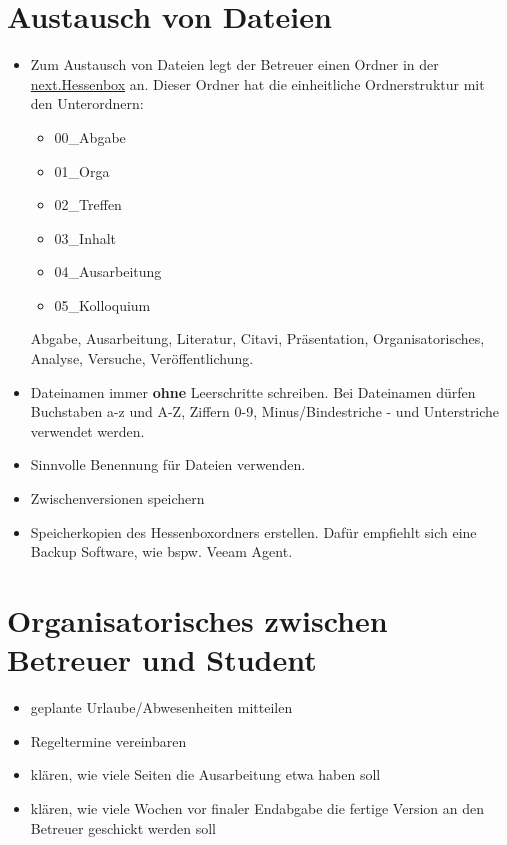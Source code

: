 \section{Austausch von Dateien}
\begin{itemize}

    \item Zum Austausch von Dateien legt der Betreuer einen Ordner in der \href{https://next.hessenbox.de/shibboleth-ds/index.html?entityID=https%3A%2F%2Fnext.hessenbox.de%2Fshibboleth&return=https%3A%2F%2Fnext.hessenbox.de%2FShibboleth.sso%2FLogin%3FSAMLDS%3D1%26target%3Dss%253Amem%253Ab869f007763b2d33bdeb1bddb90fe9367a6913159761f53f4ed9cdc768118a2e}{next.Hessenbox} an. Dieser Ordner hat die einheitliche Ordnerstruktur mit den Unterordnern:
    \begin{itemize}
    \item 00\_Abgabe
    \item 01\_Orga
    \item 02\_Treffen
    \item 03\_Inhalt
    \item 04\_Ausarbeitung
    \item 05\_Kolloquium
    \end{itemize}
    
    
    Abgabe, Ausarbeitung, Literatur, Citavi, Präsentation, Organisatorisches, Analyse, Versuche, Veröffentlichung. 
    \item Dateinamen immer \textbf{ohne} Leerschritte schreiben. Bei Dateinamen dürfen Buchstaben a-z und A-Z, Ziffern 0-9, Minus/Bindestriche - und Unterstriche verwendet werden.  
    \item Sinnvolle Benennung für Dateien verwenden. 
    \item Zwischenversionen speichern
    \item Speicherkopien des Hessenboxordners erstellen. Dafür empfiehlt sich eine Backup Software, wie bspw. Veeam Agent.
\end{itemize}

\section{Organisatorisches zwischen Betreuer und Student}
\begin{itemize}
    \item geplante Urlaube/Abwesenheiten mitteilen
    \item Regeltermine vereinbaren
    \item klären, wie viele Seiten die Ausarbeitung etwa haben soll
    \item klären, wie viele Wochen vor finaler Endabgabe die fertige Version an den Betreuer geschickt werden soll
\end{itemize}

